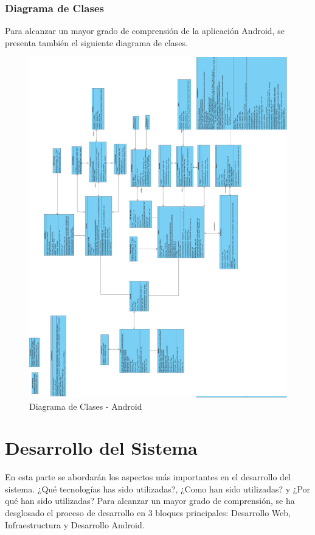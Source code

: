 \documentclass[a4paper,11pt]{book}
\begin{document}
\subsection{Diagrama de Clases}
Para alcanzar un mayor grado de comprensión de la aplicación Android, se presenta también el siguiente diagrama de clases. 
\begin{figure}[H] 
\centering 
\includegraphics[scale=0.20]{imagenes/clases/clasesAndroid.jpg}
\caption{ Diagrama de Clases - Android\cite{diagrama}  }  
\end{figure}




\chapter{Desarrollo del Sistema}
En esta parte se abordarán los aspectos más importantes en el desarrollo del sistema. ¿Qué tecnologías has sido utilizadas?, ¿Como han sido utilizadas? y ¿Por qué han sido utilizadas?
Para alcanzar un mayor grado de comprensión, se ha desglosado el proceso de desarrollo en 3 bloques principales: Desarrollo Web, Infraestructura y Desarrollo Android. 
\end{document}
